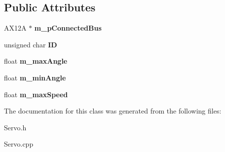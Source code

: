 \subsection*{Public Attributes}
\begin{DoxyCompactItemize}
\item 
\mbox{\label{class_servo_a6bf385f763afedca0b3e62f2087e0dce}} 
A\+X12A $\ast$ {\bfseries m\+\_\+p\+Connected\+Bus}
\item 
\mbox{\label{class_servo_aa6997ed5b3ee0bc9920489f2a8e0bdb4}} 
unsigned char {\bfseries ID}
\item 
\mbox{\label{class_servo_acd6a8ef2a2a182c2fb69365ab8a2749f}} 
float {\bfseries m\+\_\+max\+Angle}
\item 
\mbox{\label{class_servo_a764996cbde84b094c960237194d46c36}} 
float {\bfseries m\+\_\+min\+Angle}
\item 
\mbox{\label{class_servo_ae287d3e21ecc9f09552d58f1f07f16ab}} 
float {\bfseries m\+\_\+max\+Speed}
\end{DoxyCompactItemize}


The documentation for this class was generated from the following files\+:\begin{DoxyCompactItemize}
\item 
Servo.\+h\item 
Servo.\+cpp\end{DoxyCompactItemize}
